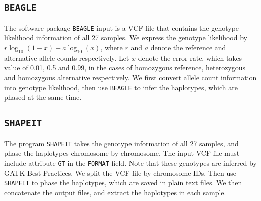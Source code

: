 \documentclass{article}
\begin{document}
\subsection{\texttt{BEAGLE}}
The software package \texttt{BEAGLE} input is a VCF file that contains the genotype likelihood information of all 27 samples. We express the genotype likelihood by $r \log_{10}(1-x) + a \log_{10}(x)$, where $r$ and $a$ denote the reference and alternative allele counts respectively. Let $x$ denote the error rate, which takes value of 0.01, 0.5 and 0.99, in the cases of homozygous reference, heterozygous and homozygous alternative respectively.
We first convert allele count information into genotype likelihood, then use \texttt{BEAGLE} to infer the haplotypes, which are phased at the same time.

\subsection{\texttt{SHAPEIT}}
The program \texttt{SHAPEIT} takes the genotype information of all 27 samples, and phase the haplotypes chromosome-by-chromosome. The input VCF file must include attribute \texttt{GT} in the \texttt{FORMAT} field. Note that these genotypes are inferred by GATK Best Practices. We split the VCF file by chromosome IDs. Then use \texttt{SHAPEIT} to phase the haplotypes, which are saved in plain text files. We then concatenate the output files, and extract the haplotypes in each sample.
\end{document}
